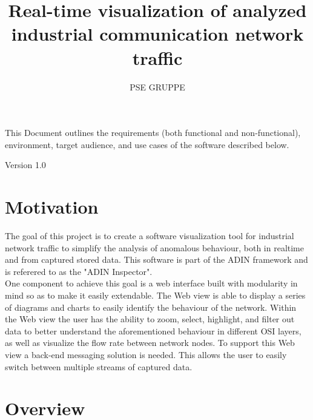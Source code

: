 \documentclass[twoside, english, final]{Pflichtenheft}
\author{PSE GRUPPE}
\title{Real-time visualization of analyzed industrial communication network traffic}
\begin{document}
\setpdf

\maketitle

This Document outlines the requirements (both functional and non-functional), environment, target audience, and use cases of the software described below.

\hfill

\begin{center}
	\large{Version 1.0}
\end{center}



\thispagestyle{empty}
\newpage
\thispagestyle{empty}
\tableofcontents
\cleardoublepage
\setcounter{page}{1}


\section{Motivation}\label{sec:intro}
The goal of this project is to create a software visualization tool for industrial network traffic to simplify the analysis of anomalous behaviour, both in realtime and from captured stored data.
\newline
\newline
This software is part of the ADIN framework and is referered to as the "ADIN Inspector".
\\
One component to achieve this goal is a web interface built with modularity in mind so as to make it easily extendable.
\newline
\newline
The Web view is able to display a series of \glspl{diagram} and charts to easily identify the behaviour of the network.
Within the Web view the user has the ability to zoom, select, highlight, and filter out data to better understand the aforementioned behaviour in different OSI layers, as well as visualize the flow rate between network nodes.
\newline
\newline
To support this Web view a back-end messaging solution is needed. This allows the user to easily switch between multiple streams of captured data.
\\
\section{Overview}
\end{document}
